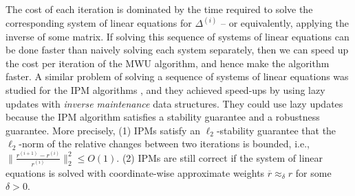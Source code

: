 \documentclass[11pt]{article}
\newcommand\rr{\boldsymbol{\mathit{r}}}
\newcommand{\ov}{\overline}
\begin{document}
The cost of each iteration is dominated by the time required to solve the corresponding system of linear equations for $\Delta^{(i)}$ -- or equivalently, applying the inverse of some matrix.
If solving this sequence of systems of linear equations can be done faster than naively solving each system separately, then we can speed up the cost per iteration of the MWU algorithm, and hence make the algorithm faster. A similar problem of solving a sequence of systems of linear equations was studied for the IPM algorithms \cite{cohen2021solving,vdB20,jiang2021faster}, and they achieved speed-ups by using lazy updates with \emph{inverse maintenance} data structures. They could use lazy updates because the IPM algorithm satisfies a stability guarantee and a robustness guarantee. More precisely, (1) IPMs satisfy an $\ell_2$-stability guarantee that the $\ell_2$-norm of the relative changes between two iterations is bounded, i.e., $\|\frac{\rr^{(i+1)} - \rr^{(i)}}{\rr^{(i)}}\|_2^2 \leq O(1)$. (2) IPMs are still correct if the system of linear equations is solved with coordinate-wise approximate weights $\ov{\rr} \approx_{\delta} \rr$ for some $\delta>0$.
\end{document}
